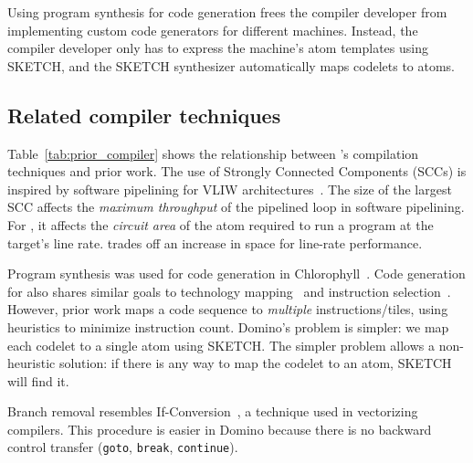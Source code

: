 Using program synthesis for code generation frees the compiler developer from
implementing custom code generators for different \absmachine machines.
Instead, the compiler developer only has to express the \absmachine machine's
atom templates using SKETCH, and the SKETCH synthesizer automatically maps
codelets to atoms.


\subsection{Related compiler techniques}
\label{ss:related_compiler}
Table~\ref{tab:prior_compiler} shows the relationship between \pktlanguage's
compilation techniques and prior work. The use of Strongly Connected Components
(SCCs) is inspired by software pipelining for VLIW
architectures~\cite{software_pipelining}. The size of the largest SCC affects
the {\em maximum throughput} of the pipelined loop in software pipelining. For
\pktlanguage, it affects the {\em circuit area} of the atom required to run a
program at the target's line rate. \pktlanguage trades off an increase in space
for line-rate performance.

Program synthesis was used for code generation in
Chlorophyll~\cite{chlorophyll}.  Code generation for \pktlanguage also shares
similar goals to technology mapping~\cite{micheli} and instruction
selection~\cite{dragonbook}.  However, prior work maps a code sequence to
\textit{multiple} instructions/tiles, using heuristics to minimize instruction
count. Domino's problem is simpler: we map each codelet to a single atom using
SKETCH.  The simpler problem allows a non-heuristic solution: if there is any
way to map the codelet to an atom, SKETCH will find it.

Branch removal resembles If-Conversion~\cite{if_conversion}, a technique used
in vectorizing compilers. This procedure is easier in Domino because there is
no backward control transfer ({\tt goto}, {\tt break}, {\tt continue}).

